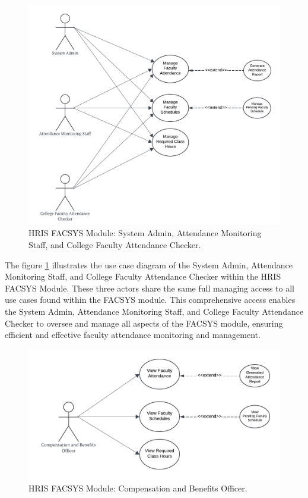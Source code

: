     \begin{figure}[H]
        \centering
        \includegraphics[width=0.9\linewidth]{figures/images/diagrams/usecase/use-case-fac-1.png}
        \caption{HRIS FACSYS Module: System Admin, Attendance Monitoring Staff, and College Faculty Attendance Checker.}
        \label{fig:use-case-fac-1}
    \end{figure}

    The figure \ref{fig:use-case-fac-1} illustrates the use case diagram of the System Admin, Attendance Monitoring Staff, and College Faculty Attendance Checker within the HRIS FACSYS Module. These three actors share the same full managing access to all use cases found within the FACSYS module. This comprehensive access enables the System Admin, Attendance Monitoring Staff, and College Faculty Attendance Checker to oversee and manage all aspects of the FACSYS module, ensuring efficient and effective faculty attendance monitoring and management.

    \begin{figure}[H]
        \centering
        \includegraphics[width=0.9\linewidth]{figures/images/diagrams/usecase/use-case-fac-2.png}
        \caption{HRIS FACSYS Module: Compensation and Benefits Officer.}
        \label{fig:use-case-fac-2}
    \end{figure}

